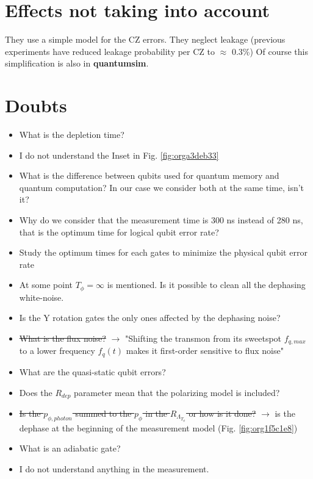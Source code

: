 \documentclass[11pt]{article}
\begin{document}
\section{Effects not taking into account}
\label{sec:orge1d0e94}

They use a simple model for the CZ errors.
They neglect leakage (previous experiments have reduced leakage probability per CZ to \(\approx\) 0.3\%)
Of course this simplification is also in \textbf{quantumsim}.



\section{Doubts}
\label{sec:org7829d77}
\begin{itemize}
\item What is the depletion time?
\item I do not understand the Inset in Fig. \ref{fig:orga3deb33}
\item What is the difference between qubits used for quantum memory and quantum computation? In our case we consider both at the same time, isn't it?
\item Why do we consider that the measurement time is 300 ns instead of 280 ns, that is the optimum time for logical qubit error rate?
\item Study the optimum times for each gates to minimize the physical qubit error rate
\item At some point \(T_{\phi} = \infty\) is mentioned. Is it possible to clean all the dephasing white-noise.
\item Is the Y rotation gates the only ones affected by the dephasing noise?
\item \sout{What is the flux noise?} \(\to\) "Shifting the transmon from its sweetspot \(f_{q,max}\) to a lower frequency \(f_q (t)\) makes it first-order sensitive to flux noise"
\item What are the quasi-static qubit errors?
\item Does the \(R_{dep}\) parameter mean that the polarizing model is included?
\item \sout{Is the \(p_{\phi, photon}\) summed to the \(p_{\phi}\) in the \(R_{\Lambda_{T_{\phi}}}\) or how is it done?} \(\to\) is the dephase at the beginning of the measurement model (Fig. \ref{fig:org1f5c1e8})
\item What is an adiabatic gate?
\item I do not understand anything in the measurement.

\end{itemize}
\end{document}
